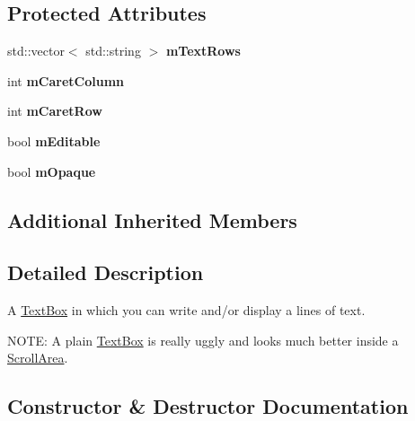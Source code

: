 \subsection*{Protected Attributes}
\begin{DoxyCompactItemize}
\item 
std\+::vector$<$ std\+::string $>$ {\bfseries m\+Text\+Rows}\hypertarget{classgcn_1_1TextBox_ac03322332b82d67e8fcc130ad8daedb4}{}\label{classgcn_1_1TextBox_ac03322332b82d67e8fcc130ad8daedb4}

\item 
int {\bfseries m\+Caret\+Column}\hypertarget{classgcn_1_1TextBox_a789033722eff6479d3f6441c1b1156a6}{}\label{classgcn_1_1TextBox_a789033722eff6479d3f6441c1b1156a6}

\item 
int {\bfseries m\+Caret\+Row}\hypertarget{classgcn_1_1TextBox_ace359650874d392a7ed5bbb07308b4da}{}\label{classgcn_1_1TextBox_ace359650874d392a7ed5bbb07308b4da}

\item 
bool {\bfseries m\+Editable}\hypertarget{classgcn_1_1TextBox_aee85a7364f811b4362f319e2d0f4e590}{}\label{classgcn_1_1TextBox_aee85a7364f811b4362f319e2d0f4e590}

\item 
bool {\bfseries m\+Opaque}\hypertarget{classgcn_1_1TextBox_a6eda3f70f2a0b6fb9a13c9605b93971f}{}\label{classgcn_1_1TextBox_a6eda3f70f2a0b6fb9a13c9605b93971f}

\end{DoxyCompactItemize}
\subsection*{Additional Inherited Members}


\subsection{Detailed Description}
A \hyperlink{classgcn_1_1TextBox}{Text\+Box} in which you can write and/or display a lines of text.

N\+O\+TE\+: A plain \hyperlink{classgcn_1_1TextBox}{Text\+Box} is really uggly and looks much better inside a \hyperlink{classgcn_1_1ScrollArea}{Scroll\+Area}. 

\subsection{Constructor \& Destructor Documentation}
